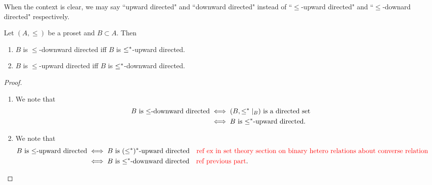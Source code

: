 \documentclass{book}
\begin{document}
	\begin{note}
		When the context is clear, we may say ``upward directed" and ``downward directed" instead of ``$\leq$-upward directed" and ``$\leq$-downard directed" respectively.
	\end{note}
	
	\begin{ex} 
		Let $(A, \leq)$ be a proset and $B \subset A$. Then 
		\begin{enumerate}
			\item $B$ is $\leq$-downward directed iff $B$ is $\leq^*$-upward directed. 
			\item $B$ is $\leq$-upward directed iff $B$ is $\leq^*$-downward directed. 
		\end{enumerate}
	\end{ex}
	
	\begin{proof}\
		\begin{enumerate}
			\item We note that 
			\begin{align*}
				\text{$B$ is $\leq$-downward directed}
				& \iff \text{$(B, \leq^*|_B)$ is a directed set} \\
				& \iff \text{$B$ is $\leq^*$-upward directed}.
			\end{align*} 
			\item 
			We note that 
			\begin{align*}
				\text{$B$ is $\leq$-upward directed}
				& \iff \text{$B$ is $(\leq^*)^*$-upward directed} \quad \text{\textcolor{red}{ref ex in set theory section on binary hetero relations about converse relation}} \\
				& \iff \text{$B$ is $\leq^*$-downward directed} \quad \text{\textcolor{red}{ref previous part}.}
			\end{align*}
		\end{enumerate}
	\end{proof}
	
	
	
	
	
	
	
	
	
	
	
	
	
	
	
	
	
	
	
	
	
	
	
	
	
	
	
\end{document}

